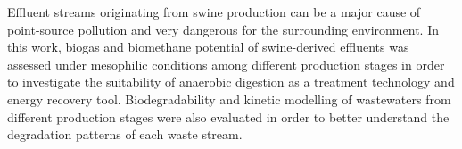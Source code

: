 Effluent streams originating from swine production can be a major cause of point-source pollution and very dangerous for the surrounding environment. In this work, biogas and biomethane potential of swine-derived effluents was assessed under mesophilic conditions among different production stages  in order to investigate the suitability of anaerobic digestion as a treatment technology and energy recovery tool. Biodegradability and kinetic modelling of wastewaters from different production stages were also evaluated in order to better understand the degradation patterns of each waste stream.